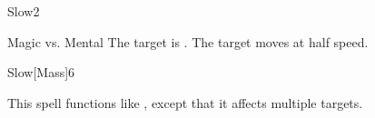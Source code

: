 \begin{spellsection}{Slow}{2}
    \begin{spellheader}
    \end{spellheader}
    \begin{spellcontent}
        \begin{spelltargetinginfo}
        \end{spelltargetinginfo}
        \begin{spelleffects}
            \begin{spellattack}{Magic vs. Mental}
                \spellsuccess The target is \slowed.
                \spellfailure The target moves at half speed.
            \end{spellattack}
            \spelldur \durshort
        \end{spelleffects}
    \end{spellcontent}
    \begin{spellfooter}
        \miscastrandom
    \end{spellfooter}
\end{spellsection}

\begin{spellsection}{Slow}[Mass]{6}
    \begin{spellheader}
    \end{spellheader}
    \begin{spellcontent}
        \begin{spelltargetinginfo}
        \end{spelltargetinginfo}
        \begin{spelleffects}
            \spellspecial This spell functions like , except that it affects multiple targets.
        \end{spelleffects}
    \end{spellcontent}
    \begin{spellfooter}
        \miscastexplode
    \end{spellfooter}
\end{spellsection}

